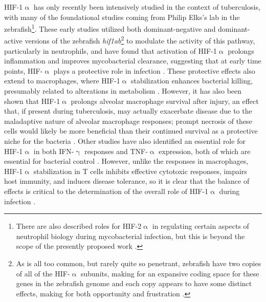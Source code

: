 HIF\hyp{}1$\upalpha$ has only recently been intensively studied in the context of tuberculosis, with many of the foundational studies coming from Philip Elks's lab in the zebrafish\footnote{There are also described roles for HIF\hyp{}2$\upalpha$ in regulating certain aspects of neutrophil biology during mycobacterial infection, but this is beyond the scope of the presently proposed work \citep{Thompson2014, Elks2015}.}. These early studies utilized both dominant\hyp{}negative and dominant\hyp{}active versions of the zebrafish \textit{hif1ab}\footnote{As is all too common, but rarely quite so penetrant, zebrafish have two copies of all of the HIF\hyp{}$\upalpha$ subunits, making for an expansive coding space for these genes in the zebrafish genome and each copy appears to have some distinct effects, making for both opportunity and frustration \citep{Elks2015}.} to modulate the activity of this pathway, particularly in neutrophils, and have found that activation of HIF\hyp{}1$\upalpha$ prolongs inflammation and improves mycobacterial clearance, suggesting that at early time points, HIF\hyp{}$\upalpha$ plays a protective role in infection \citep{Elks2011, Elks2013, Hammond2020}. These protective effects also extend to macrophages, where HIF\hyp{}1$\upalpha$ stabilization enhances bacterial killing, presumably related to alterations in metabolism \citep{Knight2018, Zenk2021}. However, it has also been shown that HIF\hyp{}1$\upalpha$ prolongs alveolar macrophage survival after injury, an effect that, if present during tuberculosis, may actually exacerbate disease due to the maladaptive nature of alveolar macrophage responses; prompt necrosis of these cells would likely be more beneficial than their continued survival as a protective niche for the bacteria \citep{Woods2022, Leemans2001}. Other studies have also identified an essential role for HIF\hyp{}1$\upalpha$ in both IFN\hyp{}$\upgamma$ responses and TNF\hyp{}$\upalpha$ expression, both of which are essential for bacterial control \citep{Braverman2016, Lewis2019, Flynn1993, Flynn1995}. However, unlike the responses in macrophages, HIF\hyp{}1$\upalpha$ stabilization in T cells inhibits effective cytotoxic responses, impairs host immunity, and induces disease tolerance, so it is clear that the balance of effects is critical to the determination of the overall role of HIF\hyp{}1$\upalpha$ during infection \citep{Liu2022b, Tzelepis2018}.

